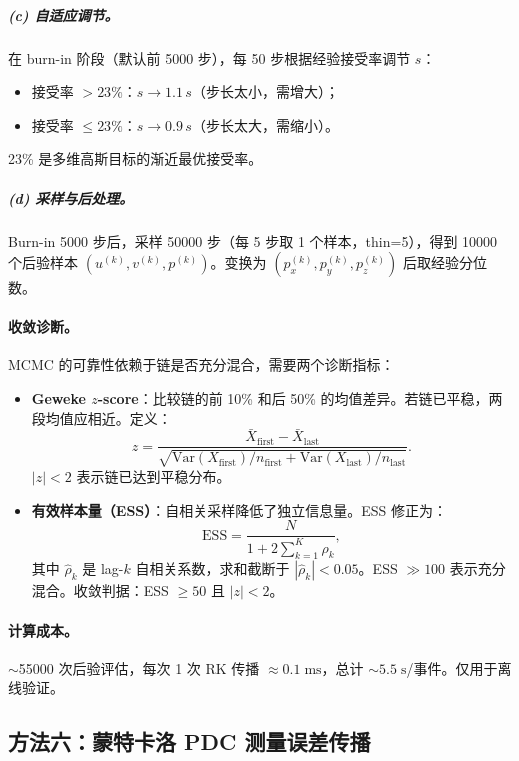 \documentclass[a4paper, 11pt]{article}
\begin{document}
\subparagraph{(c) 自适应调节。}
在 burn-in 阶段（默认前 5000 步），每 50 步根据经验接受率调节 $s$：
\begin{itemize}[nosep]
  \item 接受率 $> 23\%$：$s \to 1.1\,s$（步长太小，需增大）；
  \item 接受率 $\leq 23\%$：$s \to 0.9\,s$（步长太大，需缩小）。
\end{itemize}
23\% 是多维高斯目标的渐近最优接受率。

\subparagraph{(d) 采样与后处理。}
Burn-in 5000 步后，采样 50000 步（每 5 步取 1 个样本，thin=5），得到 10000 个后验样本 $(u^{(k)}, v^{(k)}, p^{(k)})$。变换为 $(p_x^{(k)}, p_y^{(k)}, p_z^{(k)})$ 后取经验分位数。

\paragraph{收敛诊断。}
MCMC 的可靠性依赖于链是否充分混合，需要两个诊断指标：

\begin{itemize}
  \item \textbf{Geweke $z$-score}：比较链的前 10\% 和后 50\% 的均值差异。若链已平稳，两段均值应相近。定义：
  \begin{equation}
    z = \frac{\bar{X}_\mathrm{first} - \bar{X}_\mathrm{last}}{\sqrt{\mathrm{Var}(X_\mathrm{first})/n_\mathrm{first} + \mathrm{Var}(X_\mathrm{last})/n_\mathrm{last}}}.
  \end{equation}
  $|z| < 2$ 表示链已达到平稳分布。

  \item \textbf{有效样本量（ESS）}：自相关采样降低了独立信息量。ESS 修正为：
  \begin{equation}
    \mathrm{ESS} = \frac{N}{1 + 2\sum_{k=1}^{K} \hat{\rho}_k},
  \end{equation}
  其中 $\hat{\rho}_k$ 是 lag-$k$ 自相关系数，求和截断于 $|\hat{\rho}_k| < 0.05$。ESS $\gg 100$ 表示充分混合。收敛判据：ESS $\geq 50$ 且 $|z| < 2$。
\end{itemize}

\paragraph{计算成本。} $\sim$55000 次后验评估，每次 1 次 RK 传播 $\approx 0.1\;\mathrm{ms}$，总计 $\sim 5.5\;\mathrm{s}$/事件。仅用于离线验证。

\subsection{方法六：蒙特卡洛 PDC 测量误差传播}
\label{sec:mc_pdc}
\end{document}
